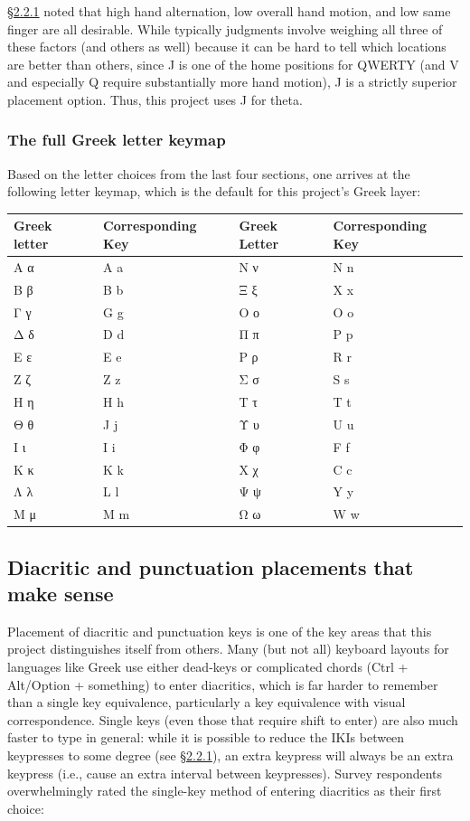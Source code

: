 \documentclass[11pt]{article}
\begin{document}
\hyperref[sec:org02f3267]{§2.2.1} noted that high hand alternation, low overall hand motion, and low same finger are all desirable. While typically judgments involve weighing all three of these factors (and others as well) because it can be hard to tell which locations are better than others, since J is one of the home positions for QWERTY (and V and especially Q require substantially more hand motion), J is a strictly superior placement option. Thus, this project uses J for theta.

\subsubsection{The full Greek letter keymap}
\label{sec:orgf02a408}

Based on the letter choices from the last four sections, one arrives at the following letter keymap, which is the default for this project's Greek layer:

\begin{center}
\begin{tabular}{ll|ll}
Greek letter & Corresponding Key & Greek Letter & Corresponding Key\\
\hline
Α α & A a & Ν ν & N n\\
Β β & B b & Ξ ξ & X x\\
Γ γ & G g & Ο ο & O o\\
Δ δ & D d & Π π & P p\\
Ε ε & E e & Ρ ρ & R r\\
Ζ ζ & Z z & Σ σ & S s\\
Η η & H h & Τ τ & T t\\
Θ θ & J  j & Υ υ & U u\\
Ι ι & I i & Φ φ & F f\\
Κ κ & K k & Χ χ & C c\\
Λ λ & L l & Ψ ψ & Y y\\
Μ μ & M m & Ω ω & W w\\
\end{tabular}
\end{center}

\subsection{Diacritic and punctuation placements that make sense}
\label{sec:org7079960}

Placement of diacritic and punctuation keys is one of the key areas that this project distinguishes itself from others. Many (but not all) keyboard layouts for languages like Greek use either dead-keys or complicated chords (Ctrl + Alt/Option + something) to enter diacritics, which is far harder to remember than a single key equivalence, particularly a key equivalence with visual correspondence. Single keys (even those that require shift to enter) are also much faster to type in general: while it is possible to reduce the IKIs between keypresses to some degree (see \hyperref[sec:org02f3267]{§2.2.1}), an extra keypress will always be an extra keypress (i.e., cause an extra interval between keypresses). Survey respondents overwhelmingly rated the single-key method of entering diacritics as their first choice:
\end{document}
